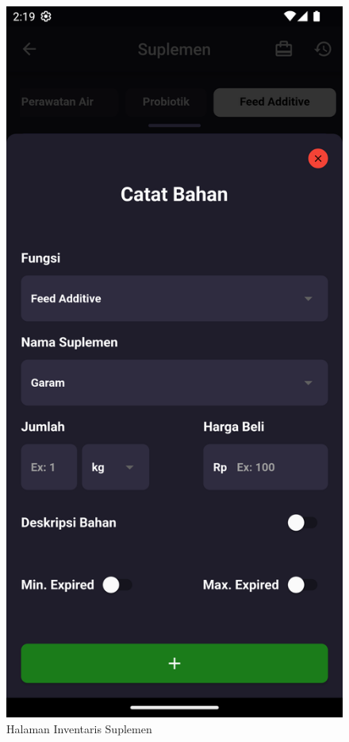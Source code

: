 \begin{spacing}{1.5}
\begin{enumerate}
\begin{enumerate}
\begin{itemize}
\begin{figure}[H]
						\caption{Halaman Inventaris Suplemen}
					\endminipage\hfill
						\includegraphics[width=\linewidth]{gambar/sprint4/sup_2.png}

\end{figure}
\end{itemize}
\end{enumerate}
\end{enumerate}
\end{spacing}
